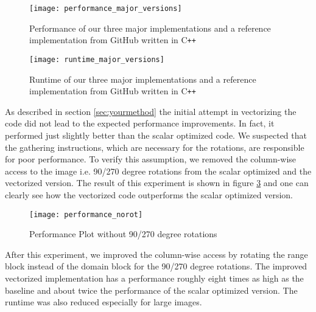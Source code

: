 \begin{figure}[H]
  \centering
  \texttt{[image: performance\_major\_versions]}
  \caption{Performance of our three major implementations and a reference
    implementation from GitHub written in C\texttt{++}}\label{fig:perf}
\end{figure}


\begin{figure}[H]
  \centering
  \texttt{[image: runtime\_major\_versions]}
  \caption{Runtime of our three major implementations and a reference
    implementation from GitHub written in C\texttt{++}}\label{fig:runtime}
\end{figure}

As described in section \ref{sec:yourmethod} the initial attempt in vectorizing
the code did not lead to the expected performance improvements. In fact, it
performed just slightly better than the scalar optimized code. We suspected that
the gathering instructions, which are necessary for the rotations, are
responsible for poor performance. To verify this assumption, we removed the
column-wise access to the image i.e. 90/270 degree rotations from the scalar
optimized and the vectorized version. The result of this experiment is shown in
figure \ref{fig:perf_40_41} and one can clearly see how the vectorized code
outperforms the scalar optimized version.

\begin{figure}[H]
  \centering
  \texttt{[image: performance\_norot]}
  \caption{Performance Plot without 90/270 degree rotations}\label{fig:perf_40_41}
\end{figure}


After this experiment, we improved the column-wise access by rotating the range
block instead of the domain block for the 90/270 degree rotations. The improved
vectorized implementation has a performance roughly eight times as high as the
baseline and about twice the performance of the scalar optimized version. The
runtime was also reduced especially for large images.
